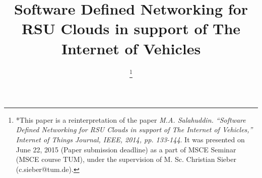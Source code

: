 \documentclass[conference]{IEEEtran}
\begin{document}
%
\title{Software Defined Networking for RSU Clouds in support of The Internet of Vehicles}

\author{

\thanks{*This paper is a reinterpretation of the paper \emph{M.A. Salahuddin. ``Software Defined Networking for RSU Clouds in support of The Internet of Vehicles,'' Internet of Things Journal, IEEE, 2014, pp. 133-144}. It was presented on June 22, 2015 (Paper submission deadline) as a part of MSCE Seminar (MSCE course TUM), under the supervision of M. Sc. 
Christian Sieber (c.sieber@tum.de).}
}


% 
\end{document}
